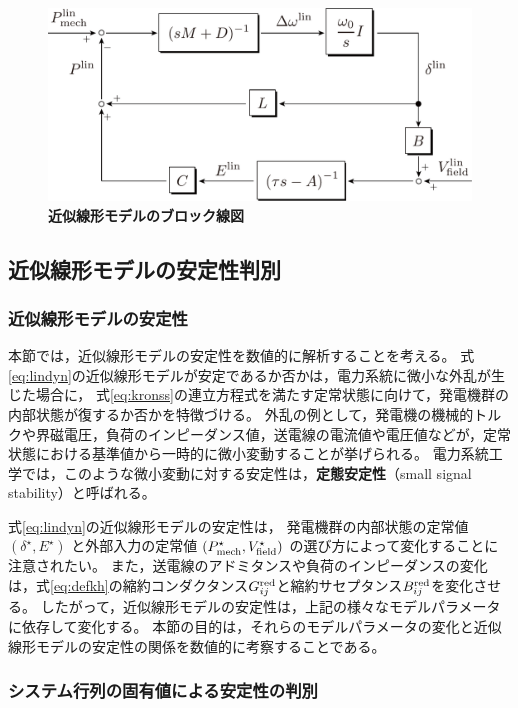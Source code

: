 \documentclass[tombow,dvipdfmx]{corona-a5-1.1}
\begin{document}
\begin{figure}[t]
\centering
\includegraphics[width = .8\linewidth]{figs/blocklinsys3}
\medskip
\caption{\textbf{近似線形モデルのブロック線図}}
\label{fig:blocklinsys}
\medskip
\end{figure}

\subsection{近似線形モデルの安定性判別}

\subsubsection{近似線形モデルの安定性}

本節では，近似線形モデルの安定性を数値的に解析することを考える。
式\ref{eq:lindyn}の近似線形モデルが安定であるか否かは，電力系統に微小な外乱が生じた場合に，
式\ref{eq:kronss}の連立方程式を満たす定常状態に向けて，発電機群の内部状態が復するか否かを特徴づける。
外乱の例として，発電機の機械的トルクや界磁電圧，負荷のインピーダンス値，送電線の電流値や電圧値などが，定常状態における基準値から一時的に微小変動することが挙げられる。
電力系統工学では，このような微小変動に対する安定性は，\textbf{定態安定性}（small signal stability）と呼ばれる。


式\ref{eq:lindyn}の近似線形モデルの安定性は，
発電機群の内部状態の定常値
$(\delta^{\star},E^{\star})$
と外部入力の定常値
$(P_{{\rm mech}}^{\star},V_{{\rm field}}^{\star})$
の選び方によって変化することに注意されたい。
また，送電線のアドミタンスや負荷のインピーダンスの変化は，式\ref{eq:defkh}の縮約コンダクタンス$G^{\rm red}_{ij}$と縮約サセプタンス$B^{\rm red}_{ij}$を変化させる。
したがって，近似線形モデルの安定性は，上記の様々なモデルパラメータに依存して変化する。
本節の目的は，それらのモデルパラメータの変化と近似線形モデルの安定性の関係を数値的に考察することである。

\subsubsection{システム行列の固有値による安定性の判別}
\end{document}
